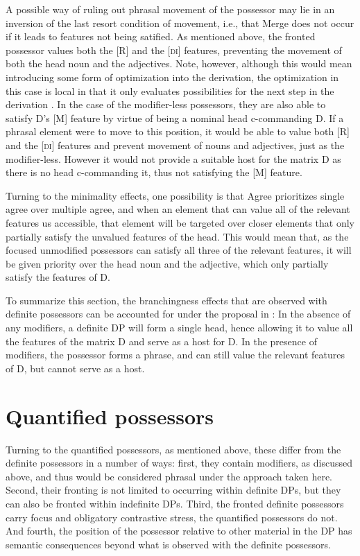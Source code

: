 \documentclass[output=paper,colorlinks,citecolor=brown,
]{langscibook}
\begin{document}
A possible way of ruling out phrasal movement of the possessor may lie in an inversion of the last resort condition of movement, i.e., that Merge does not occur if it leads to features not being satified. As mentioned above, the fronted possessor values both the [R] and the [\textsc{di}] features, preventing the movement of both the head noun and the adjectives. Note, however, although this would mean introducing some form of optimization into the derivation, the optimization in this case is local in that it only evaluates possibilities for the next step in the derivation \citep[cf.][]{heck2007,Lahne:2009va}. In the case of the modifier-less possessors, they are also able to satisfy D's [M] feature by virtue of being a nominal head c-commanding D. If a phrasal element were to move to this position, it would be able to value both [R] and the [\textsc{di}] features and prevent movement of nouns and adjectives, just as the modifier-less. However it would not provide a suitable host for the matrix D as there is no head c-commanding it, thus not satisfying the [M] feature.

Turning to the minimality effects, one possibility is that Agree prioritizes single agree over multiple agree, and when an element that can value all of the relevant features us accessible, that element will be targeted over closer elements that only partially satisfy the unvalued features of the head. This would mean that, as the focused unmodified possessors can satisfy all three of the relevant features, it will be given priority over the head noun and the adjective, which only partially satisfy the features of D.

To summarize this section, the branchingness effects that are observed with definite possessors can be accounted for under the proposal in \citet{hardarson2020}: In the absence of any modifiers, a definite DP will form a single head, hence allowing it to value all the features of the matrix D and serve as a host for D. In the presence of modifiers, the possessor forms a phrase, and can still value the relevant features of D, but cannot serve as a host.


\section{Quantified possessors}\label{sec:hardarson:3}

Turning to the quantified possessors, as mentioned above, these differ from the definite possessors in a number of ways: first, they contain modifiers, as discussed above, and thus would be considered phrasal under the approach taken here. Second, their fronting is not limited to occurring within definite DPs, but they can also be fronted within indefinite DPs. Third, the fronted definite possessors carry focus and obligatory contrastive stress, the quantified possessors do not. And fourth, the position of the possessor relative to other material in the DP has semantic consequences beyond what is observed with the definite possessors.
\end{document}
